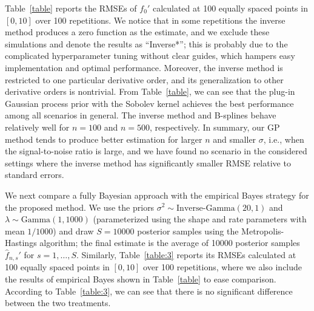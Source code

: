 \documentclass[12pt]{article}
\theoremstyle{plain}
\theoremstyle{nonitalicremark}
\begin{document}
\begin{appendices}
Table~\ref{table} reports the RMSEs of $f_0'$ calculated at 100 equally spaced points in $[0, 10]$ over 100 repetitions. We notice that in some repetitions the inverse method produces a zero function as the estimate, and we exclude these simulations and denote the results as ``Inverse*''; this is probably due to the complicated hyperparameter tuning without clear guides, which hampers easy implementation and optimal performance. Moreover, the inverse method is restricted to one particular derivative order, and its generalization to other derivative orders is nontrivial. From Table~\ref{table}, we can see that the plug-in Gaussian process prior with the Sobolev kernel achieves the best performance among all scenarios in general. The inverse method and B-splines behave relatively well for $n=100$ and $n=500$, respectively. In summary, our GP method tends to produce better estimation for larger $n$ and smaller $\sigma$, i.e., when the signal-to-noise ratio is large, and we have found no scenario in the considered settings where the inverse method has significantly smaller RMSE relative to standard errors.

We next compare a fully Bayesian approach with the empirical Bayes strategy for the proposed method. We use the priors $\sigma^2\sim \text{Inverse-Gamma}(20, 1)$ and $\lambda \sim \text{Gamma}(1, 1000)$ (parameterized using the shape and rate parameters with mean $1/1000$) and draw $S=10000$ posterior samples using the Metropolis-Hastings algorithm; the final estimate is the average of 10000 posterior samples $\hat f_{n,s}'$ for $s=1,\ldots ,S$. Similarly, Table~\ref{table:3} reports its RMSEs calculated at 100 equally spaced points in $[0, 10]$ over 100 repetitions, where we also include the results of empirical Bayes shown in Table~\ref{table} to ease comparison. According to Table~\ref{table:3}, we can see that there is no significant difference between the two treatments.


\end{appendices}
\end{document}
